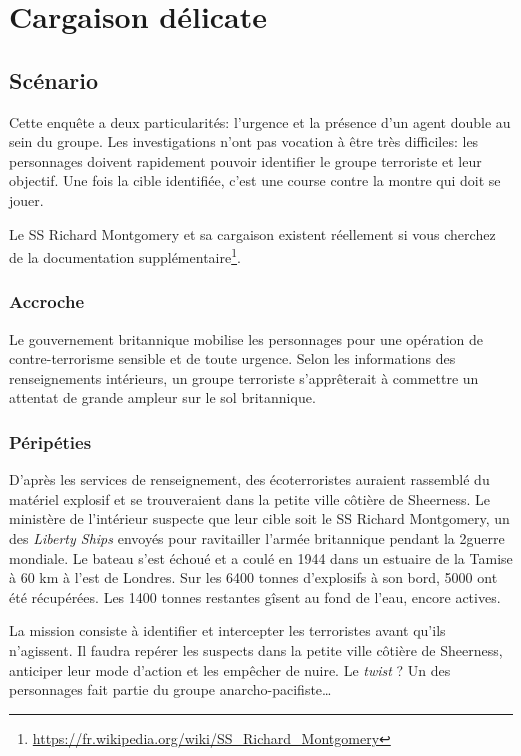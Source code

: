 \chapter{Cargaison délicate}

\section{Scénario}

Cette enquête a deux particularités: l'urgence et la présence d'un agent double au sein du groupe.
Les investigations n'ont pas vocation à être très difficiles: les personnages doivent rapidement pouvoir identifier le groupe terroriste et leur objectif.
Une fois la cible identifiée, c'est une course contre la montre qui doit se jouer.

Le SS Richard Montgomery et sa cargaison existent réellement si vous cherchez de la documentation supplémentaire\footnote{\url{https://fr.wikipedia.org/wiki/SS_Richard_Montgomery}}.

\subsection{Accroche}

Le gouvernement britannique mobilise les personnages pour une opération de contre-terrorisme sensible et de toute urgence.
Selon les informations des renseignements intérieurs, un groupe terroriste s'apprêterait à commettre un attentat de grande ampleur sur le sol britannique.

\subsection{Péripéties}

D'après les services de renseignement, des écoterroristes auraient rassemblé du matériel explosif et se trouveraient dans la petite ville côtière de Sheerness.
Le ministère de l'intérieur suspecte que leur cible soit le SS Richard Montgomery, un des \emph{Liberty Ships}  envoyés pour ravitailler l'armée britannique pendant la 2\ieme guerre mondiale.
Le bateau s'est échoué et a coulé en 1944 dans un estuaire de la Tamise à 60 km à l'est de Londres.
Sur les 6400 tonnes d'explosifs à son bord, 5000 ont été récupérées.
Les 1400 tonnes restantes gîsent au fond de l'eau, encore actives.

La mission consiste à identifier et intercepter les terroristes avant qu'ils n'agissent. Il faudra repérer les suspects dans la petite ville côtière de Sheerness, anticiper leur mode d'action et les empêcher de nuire. Le \emph{twist} ? Un des personnages fait partie du groupe anarcho-pacifiste\dots

